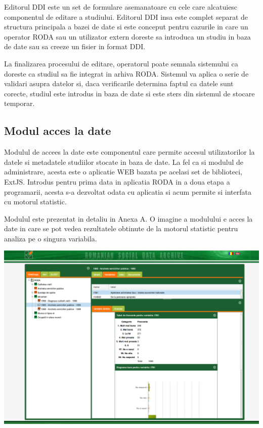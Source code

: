 \documentclass[a4paper, 10pt]{article}
\begin{document}
{Editorul DDI este un set de formulare asemanatoare cu cele care alcatuiesc
componentul de editare a studiului. Editorul DDI insa este complet
separat de structura principala a bazei de date si este conceput pentru
cazurile in care un operator RODA sau un utilizator extern doreste
sa introduca un studiu in baza de date sau sa creeze un fisier in
format DDI. 

La finalizarea procesului de editare, operatorul poate semnala sistemului
ca doreste ca studiul sa fie integrat in arhiva RODA. Sistemul va
aplica o serie de validari asupra datelor si, daca verificarile determina
faptul ca datele sunt corecte, studiul este introdus in baza de date
si este sters din sistemul de stocare temporar. 

\subsection{Modul acces la date}

Modulul de accees la date este componentul care permite accesul utilizatorilor
la datele si metadatele studiilor stocate in baza de date. La fel
ca si modulul de administrare, acesta este o aplicatie WEB bazata
pe acelasi set de biblioteci, ExtJS. Introdus pentru prima data in
aplicatia RODA in a doua etapa a programarii, acesta s-a dezvoltat
odata cu aplicatia si acum permite si interfata cu motorul statistic. 

Modulul este prezentat in detaliu in Anexa A. O imagine a modulului
e acces la date in care se pot vedea rezultatele obtinute de la motorul
statistic pentru analiza pe o singura variabila. 

\includegraphics[width=14cm]{img/Screenshot-statistics}

}
\end{document}
